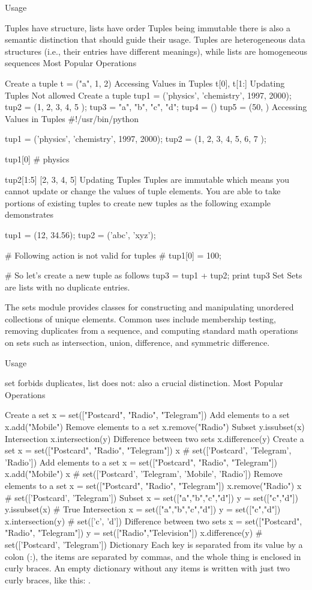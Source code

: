 Usage

Tuples have structure, lists have order
Tuples being immutable there is also a semantic distinction that should guide their usage. Tuples are heterogeneous data structures (i.e., their entries have different meanings), while lists are homogeneous sequences
Most Popular Operations

Create a tuple
t = ("a", 1, 2)
Accessing Values in Tuples
t[0], t[1:]
Updating Tuples
Not allowed
Create a tuple
tup1 = ('physics', 'chemistry', 1997, 2000);
tup2 = (1, 2, 3, 4, 5 );
tup3 = "a", "b", "c", "d";
tup4 = ()
tup5 = (50, )
Accessing Values in Tuples
#!/usr/bin/python

tup1 = ('physics', 'chemistry', 1997, 2000);
tup2 = (1, 2, 3, 4, 5, 6, 7 );

tup1[0]
# physics

tup2[1:5]
[2, 3, 4, 5]
Updating Tuples
Tuples are immutable which means you cannot update or change the values of tuple elements. You are able to take portions of existing tuples to create new tuples as the following example demonstrates

tup1 = (12, 34.56);
tup2 = ('abc', 'xyz');

# Following action is not valid for tuples
# tup1[0] = 100;

# So let's create a new tuple as follows
tup3 = tup1 + tup2;
print tup3
Set
Sets are lists with no duplicate entries.

The sets module provides classes for constructing and manipulating unordered collections of unique elements. Common uses include membership testing, removing duplicates from a sequence, and computing standard math operations on sets such as intersection, union, difference, and symmetric difference.

Usage

set forbids duplicates, list does not: also a crucial distinction.
Most Popular Operations

Create a set
x = set(["Postcard", "Radio", "Telegram"])
Add elements to a set
x.add("Mobile")
Remove elements to a set
x.remove("Radio")
Subset
y.issubset(x)
Intersection
x.intersection(y)
Difference between two sets
x.difference(y)
Create a set
x = set(["Postcard", "Radio", "Telegram"])
x
# set(['Postcard', 'Telegram', 'Radio'])
Add elements to a set
x = set(["Postcard", "Radio", "Telegram"])
x.add("Mobile")
x
# set(['Postcard', 'Telegram', 'Mobile', 'Radio'])
Remove elements to a set
x = set(["Postcard", "Radio", "Telegram"])
x.remove("Radio")
x
# set(['Postcard', 'Telegram'])
Subset
x = set(["a","b","c","d"])
y = set(["c","d"])
y.issubset(x)
# True
Intersection
x = set(["a","b","c","d"])
y = set(["c","d"])
x.intersection(y)
# set(['c', 'd'])
Difference between two sets
x = set(["Postcard", "Radio", "Telegram"])
y = set(["Radio","Television"])
x.difference(y)
# set(['Postcard', 'Telegram'])
Dictionary
Each key is separated from its value by a colon (:), the items are separated by commas, and the whole thing is enclosed in curly braces. An empty dictionary without any items is written with just two curly braces, like this: {}.

